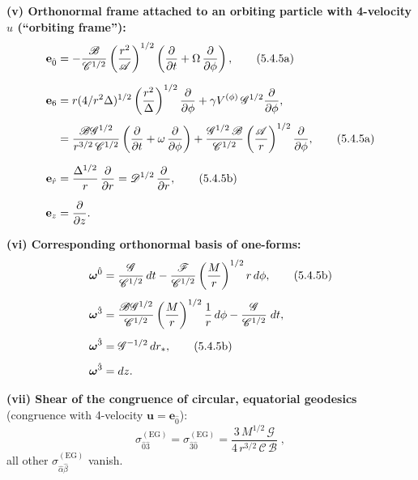 \medskip
\noindent
\textbf{(v) Orthonormal frame attached to an orbiting particle with 4-velocity $u$
(``orbiting frame''):}
%
\begin{align}
\mathbf{e}_{\hat{0}} &= -\frac{\mathscr{B}}{\mathscr{C}^{1/2}}\left(
\frac{r^2}{\mathscr{A}}\right)^{1/2}
\left(\frac{\partial}{\partial t}
+ \Omega\,\frac{\partial}{\partial\phi}\right),
\tag{5.4.5a}\\[6pt]
\mathbf{e}_6 &= r(4/r^2\Delta)^{1/2}
\left(\frac{r^2}{\Delta}\right)^{1/2}
\frac{\partial}{\partial\phi}
+ \gamma V^{(\phi)}\,\mathscr{G}^{1/2}
\frac{\partial}{\partial\phi},\notag\\[3pt]
&= \frac{\mathscr{B}\mathscr{G}^{1/2}}{r^{3/2}\,\mathscr{C}^{1/2}}
\left(\frac{\partial}{\partial t}
+ \omega\,\frac{\partial}{\partial\phi}\right)
+ \frac{\mathscr{G}^{1/2}\,\mathscr{B}}{\mathscr{C}^{1/2}}
\left(\frac{\mathscr{A}}{r}\right)^{1/2}
\frac{\partial}{\partial\phi},
\tag{5.4.5a}\\[6pt]
\mathbf{e}_{\hat{r}} &= \frac{\Delta^{1/2}}{r}\,\frac{\partial}{\partial r}
= \mathscr{D}^{1/2}\,\frac{\partial}{\partial r},
\tag{5.4.5b}\\[6pt]
\mathbf{e}_z &= \frac{\partial}{\partial z}.
\end{align}

\medskip
\noindent
\textbf{(vi) Corresponding orthonormal basis of one-forms:}
%
\begin{align}
\boldsymbol{\omega}^{\hat{0}} &= \frac{\mathscr{G}}{\mathscr{C}^{1/2}}\,dt
- \frac{\mathscr{F}}{\mathscr{C}^{1/2}}\left(\frac{M}{r}\right)^{1/2}
r\,d\phi ,
\tag{5.4.5b}\\[4pt]
\boldsymbol{\omega}^{\hat{3}} &= \frac{\mathscr{B}\mathscr{G}^{1/2}}
{\mathscr{C}^{1/2}}\left(\frac{M}{r}\right)^{1/2}
\frac{1}{r}\,d\phi
- \frac{\mathscr{G}}{\mathscr{C}^{1/2}}\;dt ,
\notag\\[4pt]
\boldsymbol{\omega}^{\hat{3}} &= \mathscr{G}^{-1/2}\,dr_* ,
\tag{5.4.5b}\\[4pt]
\boldsymbol{\omega}^{\hat{3}} &= dz .
\end{align}

\medskip
\noindent
\textbf{(vii) Shear of the congruence of circular, equatorial geodesics} (congruence with
4-velocity $\mathbf{u} = \mathbf{e}_{\hat{0}}$):
%
\begin{equation}
\sigma_{\hat{0}\hat{3}}^{(\text{EG})}
= \sigma_{\hat{3}\hat{0}}^{(\text{EG})} = \frac{3\,M^{1/2}\,\mathscr{G}}
{4\,r^{3/2}\,\mathscr{C}\,\mathscr{B}}\;,
\tag{5.4.6}
\end{equation}
%
all other $\sigma_{\hat{\alpha}\hat{\beta}}^{(\text{EG})}$ vanish.

